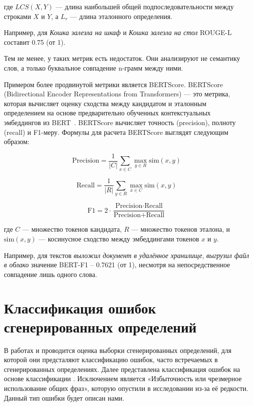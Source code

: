 \documentclass[LI,VKR]{HSEUniversity}
\begin{document}
где $LCS(X, Y)$ — длина наибольшей общей подпоследовательности между строками $X$ и $Y$, а $L_r$ — длина эталонного определения.

Например, для \textit{Кошка залезла на шкаф} и \textit{Кошка залезла на стол} ROUGE-L составит 0.75 (от 1).

Тем не менее, у таких метрик есть недостаток.
Они анализируют не семантику слов, а только буквальное совпадение n-грамм между ними.

Примером более продвинутой метрики является BERTScore.
BERTScore (Bidirectional Encoder Representations from Transformers) — это метрика,
которая вычисляет оценку сходства между кандидатом и эталонным определением
на основе предварительно обученных контекстуальных эмбеддингов из BERT~\cite{BERTScore}.
BERTScore вычисляет точность (precision), полноту (recall) и F1-меру.
Формулы для расчета BERTScore выглядят следующим образом:

\begin{equation}
\text{Precision} = \frac{1}{|C|} \sum_{x \in C} \max_{y \in R} \text{sim}(x, y)
\end{equation}

\begin{equation}
\text{Recall} = \frac{1}{|R|} \sum_{y \in R} \max_{x \in C} \text{sim}(x, y)
\end{equation}

\begin{equation}
\text{F1} = 2 \cdot \frac{\text{Precision} \cdot \text{Recall}}{\text{Precision} + \text{Recall}}
\end{equation}

где $C$ — множество токенов кандидата, $R$ — множество токенов эталона,
и $\text{sim}(x, y)$ — косинусное сходство между эмбеддингами токенов $x$ и $y$.

Например, для текстов \textit{выложил документ в удалённое хранилище}, \textit{выгрузил файл в облако}
значение BERT-F1 -- 0.7621 (от 1), несмотря на непосредственное совпадение лишь одного слова.

\section{Классификация ошибок сгенерированных определений}

В работах \cite{huang-etal-2021-definition} и \cite{noraset2016definition} проводится оценка выборки сгенерированных определений,
для которой они предсталяют классификацию ошибок,
часто встречаемых в сгенерированных определениях.
Далее представлена классификация ошибок на основе классификации \cite{huang-etal-2021-definition}.
Исключением является «Избыточность или чрезмерное использование общих фраз»,
которую опустили в исследовании из-за её редкости.
Данный тип ошибки будет описан нами.
\end{document}
